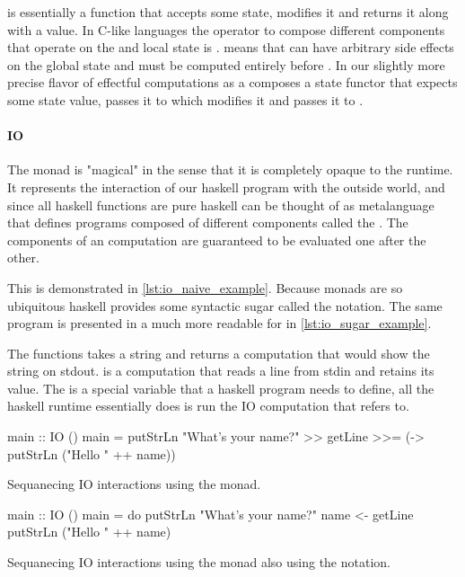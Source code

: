  is essentially a function that accepts some state, modifies it
and returns it along with a value. In C-like languages the operator to
compose different components that operate on the and local state is
\cpp{;}.  means that  can have arbitrary side effects on
the global state and must be computed entirely before . In our
slightly more precise flavor of effectful computations  as a
 composes a state functor that expects some state value, passes
it to  which modifies it and passes it to .

\paragraph{IO}

The  monad is "magical" in the sense that it is completely
opaque to the runtime. It represents the interaction of our haskell
program with the outside world, and since all haskell functions are
pure haskell can be thought of as metalanguage that defines programs
composed of different  components called the . The components of an  computation are guaranteed to
be evaluated one after the other.

This is demonstrated in \ref{lst:io_naive_example}. Because monads are so
ubiquitous haskell provides some syntactic sugar called the 
notation. The same program is presented in a much more readable for in
\ref{lst:io_sugar_example}.

The functions  takes a string and returns
a computation that would show the string on stdout.  is a computation that reads a line from stdin and retains its
value. The  is a special variable that a haskell
program needs to define, all the haskell runtime essentially does is
run the IO computation that  refers to.

\begin{code}
\begin{haskellcode}
main :: IO ()
main = putStrLn "What's your name?"
       >> getLine
       >>= (\name -> putStrLn ("Hello " ++ name))
\end{haskellcode}
  \caption{\label{lst:io_naive_example}Sequanecing IO interactions
    using the  monad.}
\end{code}

\begin{code}
\begin{haskellcode}
main :: IO ()
main = do
  putStrLn "What's your name?"
  name <- getLine
  putStrLn ("Hello " ++ name)
\end{haskellcode}
  \caption{\label{lst:io_sugar_example}Sequanecing IO interactions
    using the  monad also using the  notation.}
\end{code}

